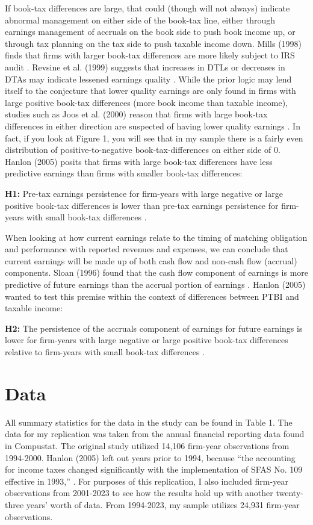 \documentclass[12pt]{article}
\begin{document}
If book-tax differences are large, that could (though will not always) indicate abnormal management on either side of the book-tax line, either through earnings management of accruals on the book side to push book income up, or through tax planning on the tax side to push taxable income down. Mills (1998) finds that firms with larger book-tax differences are more likely subject to IRS audit \citep{Mills98}. Revsine et al. (1999) suggests that increases in DTLs or decreases in DTAs may indicate lessened earnings quality \citep{Revsine99}. While the prior logic may lend itself to the conjecture that lower quality earnings are only found in firms with large positive book-tax differences (more book income than taxable income), studies such as Joos et al. (2000) reason that firms with large book-tax differences in either direction are suspected of having lower quality earnings \citep{Joos00}. In fact, if you look at Figure 1, you will see that in my sample there is a fairly even distribution of positive-to-negative book-tax-differences on either side of 0. Hanlon (2005) posits that firms with large book-tax differences have less predictive earnings than firms with smaller book-tax differences:

\textbf{H1:} Pre-tax earnings persistence for firm-years with large negative or large positive book-tax differences is lower than pre-tax earnings persistence for firm-years with small book-tax differences \citet{Hanlon05}.

When looking at how current earnings relate to the timing of matching obligation and performance with reported revenues and expenses, we can conclude that current earnings will be made up of both cash flow and non-cash flow (accrual) components. Sloan (1996) found that the cash flow component of earnings is more predictive of future earnings than the accrual portion of earnings \citep{Sloan96}. Hanlon (2005) wanted to test this premise within the context of differences between PTBI and taxable income:

\textbf{H2:} The persistence of the accruals component of earnings for future earnings is lower for firm-years with large negative or large positive book-tax differences relative to firm-years with small book-tax differences \citep{Hanlon05}. 

\section{Data}
All summary statistics for the data in the study can be found in Table 1. The data for my replication was taken from the annual financial reporting data found in Compustat. The original study utilized 14,106 firm-year observations from 1994-2000. Hanlon (2005) left out years prior to 1994, because “the accounting for income taxes changed significantly with the implementation of SFAS No. 109 effective in 1993,” \citep{Hanlon05}. For purposes of this replication, I also included firm-year observations from 2001-2023 to see how the results hold up with another twenty-three years’ worth of data. From 1994-2023, my sample utilizes 24,931 firm-year observations.
\end{document}
